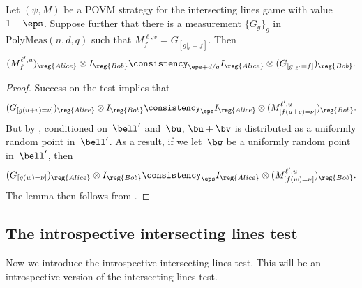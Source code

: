 \begin{lemma}\label{lem:intersecting-lines}
Let $(\psi, M)$ be a POVM strategy for the intersecting lines game
with value $1-\eps$.
Suppose further that there is a measurement $\{G_g\}_g$ in $\mathrm{PolyMeas}(n,d,q)$ such that
$M^{\ell, v}_{f} = G_{[g|_{\ell}=f]}$. Then
\begin{equation*}
(M^{\ell', u}_{f})_{\reg{Alice}} \otimes I_{\reg{Bob}} \consistency_{\eps + d/q} I_{\reg{Alice}} \otimes (G_{[g|_{\ell'}=f]})_{\reg{Bob}}.
\end{equation*}
\end{lemma}
\begin{proof}
Success on the test implies that
\begin{equation*}
(G_{[g(u + v) = \nu]})_{\reg{Alice}} \otimes I_{\reg{Bob}}
\consistency_{\eps} I_{\reg{Alice}} \otimes (M^{\ell', u}_{[f(u + v) = \nu]})_{\reg{Bob}}.
\end{equation*}
But by , conditioned on~$\bell'$ and~$\bu$, $\bu + \bv$
is distributed as a uniformly random point in~$\bell'$.
As a result, if we let~$\bw$ be a uniformly random point in~$\bell'$, then
\begin{equation*}
(G_{[g(w) = \nu]})_{\reg{Alice}} \otimes I_{\reg{Bob}}
\consistency_{\eps} I_{\reg{Alice}} \otimes (M^{\ell', u}_{[f(w) = \nu]})_{\reg{Bob}}.
\end{equation*}
The lemma then follows from .
\end{proof}

\subsection{The introspective intersecting lines test}\label{sec:introspective-lines-transfer}

Now we introduce the introspective intersecting lines test.
This will be an introspective version of the intersecting lines test.

